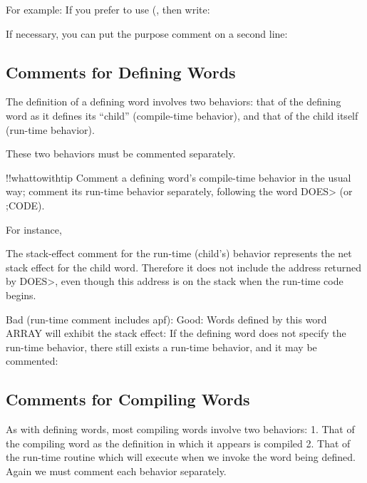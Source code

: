For example:
If you prefer to use (, then write:

If necessary, you can put the purpose comment on a second line:
\subsection{Comments for Defining Words}
The definition of a defining word involves two behaviors:
that of the defining word as it defines its ``child'' (compile-time behavior),
and
that of the child itself (run-time behavior).

These two behaviors must be commented separately.

!!whattowithtip{
Comment a defining word's compile-time behavior in the usual way; comment
its run-time behavior separately, following the word DOES> (or
;CODE).
}

For instance,

The stack-effect comment for the run-time (child's) behavior represents
the net stack effect for the child word.  Therefore it does not include the
address returned by DOES>, even though this address is on the stack
when the run-time code begins.

Bad (run-time comment includes apf):
Good:
Words defined by this word ARRAY will exhibit the stack effect:
If the defining word does not specify the run-time behavior, there still
exists a run-time behavior, and it may be commented:
\subsection{Comments for Compiling Words}
As with defining words, most compiling words involve two behaviors:
1. That of the compiling word as the definition in which it appears is compiled
2. That of the run-time routine which will execute when we invoke the word
being defined.  Again we must comment each behavior separately.

